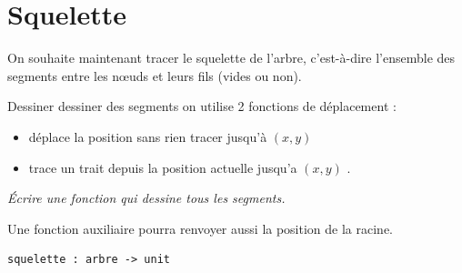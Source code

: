 \section{Squelette}
\begin{minipage}{0.5\textwidth}
On souhaite maintenant tracer le squelette de l'arbre, c'est-à-dire l'ensemble des segments entre les nœuds et leurs fils (vides ou non).

Dessiner dessiner des segments on utilise 2 fonctions de déplacement :

\begin{itemize}
  \item {} déplace la position sans rien tracer jusqu'à $(x,y)$
  \item {} trace un trait depuis la position actuelle jusqu'a $(x,y)$ .
\end{itemize}

\begin{Exercise}\it 
Écrire une fonction  qui dessine tous les segments.

Une fonction auxiliaire pourra renvoyer aussi la position de la racine.
\end{Exercise}
\begin{lstlisting}
squelette : arbre -> unit
\end{lstlisting}
\end{minipage}
\begin{minipage}{0.5\textwidth}
\begin{center}
\end{center}
\end{minipage}
